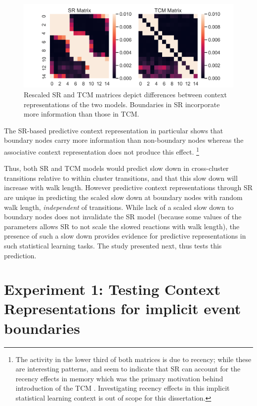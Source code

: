 \begin{figure}[ht]
	\centering
	\includegraphics[width = \textwidth]{chapter_notebooks/chapter_2/figures/SR_vs_TCM_Matrices_zoomed.png}
	\caption{Rescaled SR and TCM matrices depict differences between context representations of the two models. Boundaries in SR incorporate more information than those in TCM.}
	\label{fig:zoomed-in-SRTCM-boundary-entropy}
\end{figure}

The SR-based predictive context representation in particular shows that boundary nodes carry more information than non-boundary nodes whereas the associative context representation does not produce this effect. \footnote{The activity in the lower third of both matrices is due to recency; while these are interesting patterns, and seem to indicate that SR can account for the recency effects in memory which was the primary motivation behind introduction of the TCM \cite{gershman2012successor,howard2005temporal}. Investigating recency effects in this implicit statistical learning context is out of scope for this dissertation.}

Thus, both SR and TCM models would predict slow down in cross-cluster transitions relative to within cluster transitions, and that this slow down will increase with walk length. However predictive context representations through SR are unique in predicting the scaled slow down at boundary nodes with random walk length, \textit{independent} of transitions. While lack of a scaled slow down to boundary nodes does not invalidate the SR model (because some values of the parameters allows SR to not scale the slowed reactions with walk length), the presence of such a slow down provides evidence for predictive representations in such statistical learning tasks. The study presented next, thus tests this prediction. 
\section{Experiment 1: Testing Context Representations for implicit event boundaries}

